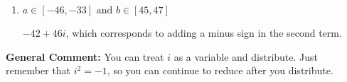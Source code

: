 \documentclass{extbook}[14pt]
\begin{document}
\begin{enumerate}
{\begin{enumerate}[label=\Alph*.]
 $-24 - 18 i$, which corresponds to just multiplying the real terms to get the real part of the solution and the coefficients in the complex terms to get the complex part.
\item \( a \in [-46, -33] \text{ and } b \in [45, 47] \)

 $-42 + 46 i$, which corresponds to adding a minus sign in the second term.
\end{enumerate}

\textbf{General Comment:} You can treat $i$ as a variable and distribute. Just remember that $i^2=-1$, so you can continue to reduce after you distribute.
}
\end{enumerate}
\end{document}
